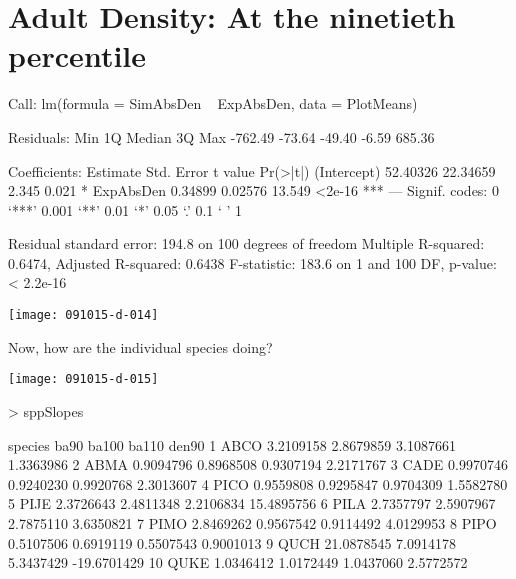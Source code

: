 \documentclass{article}
\begin{document}
\section{Adult Density: At the ninetieth percentile}
\begin{Schunk}
\begin{Soutput}
Call:
lm(formula = SimAbsDen ~ ExpAbsDen, data = PlotMeans)

Residuals:
    Min      1Q  Median      3Q     Max 
-762.49  -73.64  -49.40   -6.59  685.36 

Coefficients:
            Estimate Std. Error t value Pr(>|t|)    
(Intercept) 52.40326   22.34659   2.345    0.021 *  
ExpAbsDen    0.34899    0.02576  13.549   <2e-16 ***
---
Signif. codes:  0 ‘***’ 0.001 ‘**’ 0.01 ‘*’ 0.05 ‘.’ 0.1 ‘ ’ 1

Residual standard error: 194.8 on 100 degrees of freedom
Multiple R-squared:  0.6474,	Adjusted R-squared:  0.6438 
F-statistic: 183.6 on 1 and 100 DF,  p-value: < 2.2e-16
\end{Soutput}
\end{Schunk}
\texttt{[image: 091015-d-014]}

Now, how are the individual species doing?

\texttt{[image: 091015-d-015]}
\begin{Schunk}
\begin{Sinput}
>   sppSlopes
\end{Sinput}
\begin{Soutput}
   species       ba90     ba100     ba110       den90
1     ABCO  3.2109158 2.8679859 3.1087661   1.3363986
2     ABMA  0.9094796 0.8968508 0.9307194   2.2171767
3     CADE  0.9970746 0.9240230 0.9920768   2.3013607
4     PICO  0.9559808 0.9295847 0.9704309   1.5582780
5     PIJE  2.3726643 2.4811348 2.2106834  15.4895756
6     PILA  2.7357797 2.5907967 2.7875110   3.6350821
7     PIMO  2.8469262 0.9567542 0.9114492   4.0129953
8     PIPO  0.5107506 0.6919119 0.5507543   0.9001013
9     QUCH 21.0878545 7.0914178 5.3437429 -19.6701429
10    QUKE  1.0346412 1.0172449 1.0437060   2.5772572
\end{Soutput}
\end{Schunk}


\newpage
\end{document}
